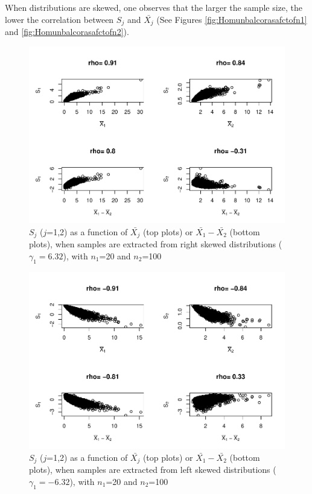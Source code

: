 \documentclass[
  english,
  man,mask]{apa6}
\begin{document}
When distributions are skewed, one observes that the larger the sample size, the lower the correlation between \(S_j\) and \(\bar{X_j}\) (See Figures \ref{fig:Homunbalcorasafctofn1} and \ref{fig:Homunbalcorasafctofn2}).

\begin{figure}
\centering
\includegraphics{Correlation_files/figure-latex/pltSDHomunbalRskew-1.pdf}
\caption{\label{fig:pltSDHomunbalRskew}\(S_j\) (\(j\)=1,2) as a function of \(\bar{X_j}\) (top plots) or \(\bar{X_1}-\bar{X_2}\) (bottom plots), when samples are extracted from right skewed distributions (\(\gamma_1 = 6.32\)), with \(n_1\)=20 and \(n_2\)=100}
\end{figure}

\begin{figure}
\centering
\includegraphics{Correlation_files/figure-latex/pltSDHomunbalLskew-1.pdf}
\caption{\label{fig:pltSDHomunbalLskew}\(S_j\) (\(j\)=1,2) as a function of \(\bar{X_j}\) (top plots) or \(\bar{X_1}-\bar{X_2}\) (bottom plots), when samples are extracted from left skewed distributions (\(\gamma_1 = -6.32\)), with \(n_1\)=20 and \(n_2\)=100}
\end{figure}
\end{document}
